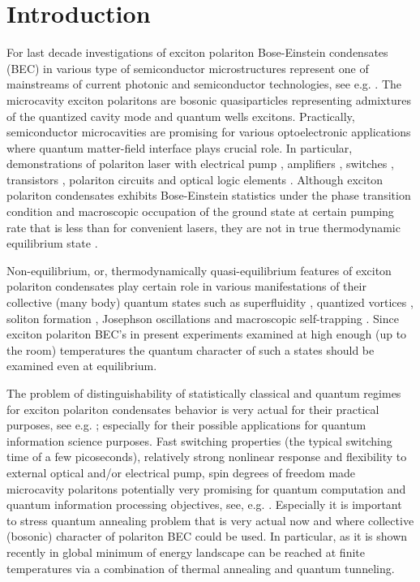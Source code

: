 \documentclass[aps, pre, preprint, groupedaddress, superscriptaddress, showkeys, showpacs] {revtex4-1}
\begin{document}
\section{Introduction \label{sec:introduction}}

For last decade investigations of exciton polariton Bose-Einstein condensates (BEC) in various type of semiconductor microstructures represent one of mainstreams of current photonic and semiconductor technologies, see e.g. \cite{Sanvitto,Guillet}.
The microcavity exciton polaritons are bosonic quasiparticles representing  admixtures of the quantized cavity mode and quantum wells excitons.
Practically, semiconductor microcavities are promising for various optoelectronic applications where quantum  matter-field interface plays crucial role.
In particular, demonstrations of polariton laser with electrical pump \cite{Bhattacharya,Schneider}, amplifiers \cite{Niemietz}, switches \cite{Amo_2010}, transistors \cite{Ballarini}, polariton circuits and optical logic elements \cite{Sturm,Liew}.
Although exciton polariton condensates exhibits Bose-Einstein statistics under the phase transition condition and macroscopic occupation of the ground state at certain pumping rate that is less than for convenient lasers, they are not in true thermodynamic equilibrium state \cite{Byrnes_2014,Sun}.
  
Non-equilibrium, or, thermodynamically quasi-equilibrium features of exciton polariton condensates play certain role in various manifestations of their collective (many body) quantum states such as superfluidity \cite{Carusotto_2013,Amo_2009}, quantized vortices \cite{Lagoudakis_2008,Lagoudakis_2009}, soliton formation \cite{Sich}, Josephson oscillations and macroscopic self-trapping \cite{Abbarchi,Lagoudakis_2010}.
Since exciton polariton BEC's in present experiments examined at high enough (up to the room) temperatures the quantum character of such a states should be examined even at equilibrium.

The problem of distinguishability of statistically classical and quantum regimes for exciton polariton condensates behavior is very actual for their practical purposes, see e.g. \cite{Dominici}; especially for their possible applications for quantum information science purposes.
Fast switching properties (the typical switching time of a few picoseconds), relatively strong nonlinear response and flexibility to external optical and/or electrical pump, spin degrees of freedom made microcavity polaritons potentially very promising for quantum computation and quantum information processing objectives, see, e.g. \cite{Demirchyan,Pagel,Kyriienko,Solnyshkov_2015, Dominici}.
Especially it is important to stress quantum annealing problem \cite{Yan} that is very actual now and where collective (bosonic) character of polariton BEC could be used.
In particular, as it is shown recently in \cite{Lewenstein} global minimum of energy landscape can be reached at finite temperatures via a combination of thermal annealing and quantum tunneling. 
\end{document}
